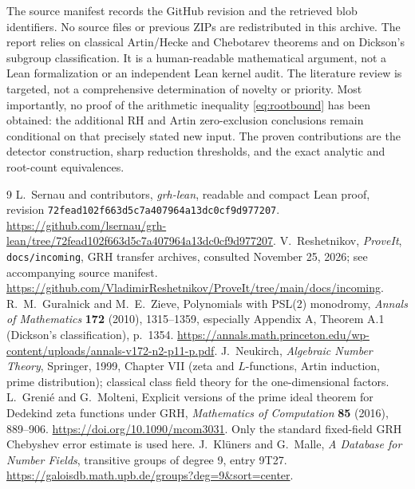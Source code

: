 \documentclass[11pt]{article}
\theoremstyle{remark}\newtheorem{remark}[theorem]{Remark}
\begin{document}
The source manifest records the GitHub revision and the retrieved blob identifiers. No source files or previous ZIPs are redistributed in this archive. The report relies on classical Artin/Hecke and Chebotarev theorems and on Dickson's subgroup classification. It is a human-readable mathematical argument, not a Lean formalization or an independent Lean kernel audit. The literature review is targeted, not a comprehensive determination of novelty or priority. Most importantly, no proof of the arithmetic inequality \eqref{eq:rootbound} has been obtained: the additional RH and Artin zero-exclusion conclusions remain conditional on that precisely stated new input. The proven contributions are the detector construction, sharp reduction thresholds, and the exact analytic and root-count equivalences.

\begin{thebibliography}{9}
 L.~Sernau and contributors, \emph{grh-lean}, readable and compact Lean proof, revision \texttt{72fead102f663d5c7a407964a13dc0cf9d977207}. \url{https://github.com/lsernau/grh-lean/tree/72fead102f663d5c7a407964a13dc0cf9d977207}.
 V.~Reshetnikov, \emph{ProveIt}, \texttt{docs/incoming}, GRH transfer archives, consulted November 25, 2026; see accompanying source manifest. \url{https://github.com/VladimirReshetnikov/ProveIt/tree/main/docs/incoming}.
 R.~M.~Guralnick and M.~E.~Zieve, Polynomials with PSL(2) monodromy, \emph{Annals of Mathematics} \textbf{172} (2010), 1315--1359, especially Appendix A, Theorem A.1 (Dickson's classification), p.~1354. \url{https://annals.math.princeton.edu/wp-content/uploads/annals-v172-n2-p11-p.pdf}.
 J.~Neukirch, \emph{Algebraic Number Theory}, Springer, 1999, Chapter VII (zeta and $L$-functions, Artin induction, prime distribution); classical class field theory for the one-dimensional factors.
 L.~Greni\'e and G.~Molteni, Explicit versions of the prime ideal theorem for Dedekind zeta functions under GRH, \emph{Mathematics of Computation} \textbf{85} (2016), 889--906. \url{https://doi.org/10.1090/mcom3031}. Only the standard fixed-field GRH Chebyshev error estimate is used here.
 J.~Kl\"uners and G.~Malle, \emph{A Database for Number Fields}, transitive groups of degree 9, entry 9T27. \url{https://galoisdb.math.upb.de/groups?deg=9&sort=center}.
\end{thebibliography}
\end{document}
